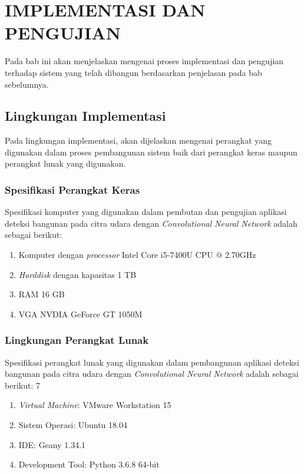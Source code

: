 \chapter{IMPLEMENTASI DAN PENGUJIAN}

%
\vspace{4.5pt}
Pada bab ini akan menjelaskan mengenai proses implementasi dan pengujian terhadap sistem yang telah dibangun berdasarkan penjelasan pada bab sebelumnya.\\

\section{Lingkungan Implementasi}
Pada lingkungan implementasi, akan dijelaskan mengenai perangkat yang digunakan dalam proses pembangunan sistem baik dari perangkat keras maupun perangkat lunak yang digunakan.\\

\subsection{Spesifikasi Perangkat Keras}
Spesifikasi komputer yang digunakan dalam pembutan dan pengujian aplikasi deteksi bangunan pada citra udara dengan \textit{Convolutional Neural Network} adalah sebagai berikut:
\begin{enumerate}
	\item Komputer dengan \textit{processor} Intel Core i5-7400U CPU $@$ 2.70GHz
	\item \textit{Harddisk} dengan kapasitas 1 TB
	\item RAM 16 GB
	\item VGA NVDIA GeForce GT 1050M
	\\
\end{enumerate}

\subsection{Lingkungan Perangkat Lunak}
Spesifikasi perangkat lunak yang digunakan dalam pembangunan aplikasi deteksi bangunan pada citra udara dengan \textit{Convolutional Neural Network} adalah sebagai berikut:
7\begin{enumerate}
	\item \textit{Virtual Machine}: VMware Workstation 15
	\item Sistem Operasi: Ubuntu 18.04
	\item IDE: Geany 1.34.1
	\item Development Tool: Python 3.6.8 64-bit
	\\
\end{enumerate}


